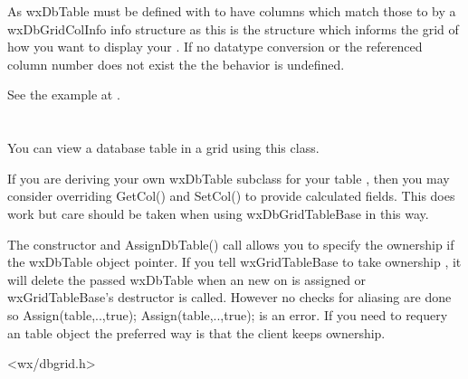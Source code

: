 

As wxDbTable must be defined with to have columns which match those  to by a wxDbGridColInfo
info structure as this is the structure which informs the grid of how you want to display your 
. If no datatype conversion or the referenced column number does not exist the
the behavior is undefined.

See the example at .

\section{}\label{wxdbgridtablebase}

You can view a database table in a grid using this class.

If you are deriving your own wxDbTable subclass for your table , then you may consider
overriding GetCol() and SetCol() to provide calculated fields. This does work but care should
be taken when using wxDbGridTableBase in this way.

The constructor and AssignDbTable() call allows you to specify the ownership if the wxDbTable
object pointer. If you tell wxGridTableBase to take ownership , it will delete the passed wxDbTable
when an new on is assigned or wxGridTableBase's destructor is called.
However no checks for aliasing are done so Assign(table,..,true); Assign(table,..,true); 
is  an error. If you need to requery an table object the preferred way is
that the client keeps ownership.




<wx/dbgrid.h>



